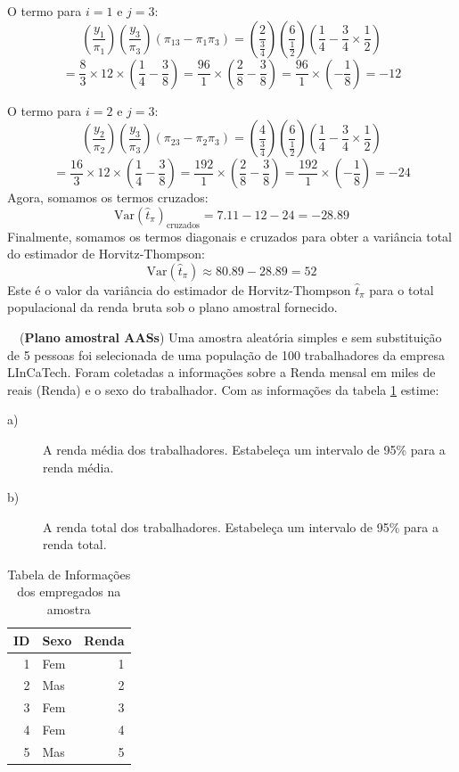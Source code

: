 \documentclass[a4paper,11pt,oneside,twocolumn]{Config/milktest}
\begin{document}
{O termo para \(i = 1\) e \(j = 3\): 
\[
\left(\frac{y_1}{\pi_1}\right) \left(\frac{y_3}{\pi_3}\right) (\pi_{13} - \pi_1 \pi_3) = \left(\frac{2}{\frac{3}{4}}\right) \left(\frac{6}{\frac{1}{2}}\right) \left(\frac{1}{4} - \frac{3}{4} \times \frac{1}{2}\right)
\] 
\[
= \frac{8}{3} \times 12 \times \left(\frac{1}{4} - \frac{3}{8}\right) = \frac{96}{1} \times \left(\frac{2}{8} - \frac{3}{8}\right) = \frac{96}{1} \times \left(-\frac{1}{8}\right) = -12
\]

O termo para \(i = 2\) e \(j = 3\): 
\[
\left(\frac{y_2}{\pi_2}\right) \left(\frac{y_3}{\pi_3}\right) (\pi_{23} - \pi_2 \pi_3) = \left(\frac{4}{\frac{3}{4}}\right) \left(\frac{6}{\frac{1}{2}}\right) \left(\frac{1}{4} - \frac{3}{4} \times \frac{1}{2}\right)
\] 
\[
= \frac{16}{3} \times 12 \times \left(\frac{1}{4} - \frac{3}{8}\right) = \frac{192}{1} \times \left(\frac{2}{8} - \frac{3}{8}\right) = \frac{192}{1} \times \left(-\frac{1}{8}\right) = -24
\] 
Agora, somamos os termos cruzados: 
\[
\text{Var}(\hat{t}_\pi)_{\text{cruzados}} = 7.11 - 12 - 24 = -28.89
\] 
Finalmente, somamos os termos diagonais e cruzados para obter a variância total do estimador de Horvitz-Thompson:
\[
\text{Var}(\hat{t}_\pi) \approx 80.89 - 28.89 = 52
\] 
Este é o valor da variância do estimador de Horvitz-Thompson \(\hat{t}_\pi\) para o total populacional da renda bruta sob o plano amostral fornecido.

}

\medskip 
\question~~({\bf Plano amostral AASs}) Uma amostra aleatória simples e sem substituição de 5 pessoas foi selecionada de uma população de 100 trabalhadores da empresa LInCaTech. Foram coletadas a informações sobre a Renda mensal em miles de reais (Renda) e o sexo do trabalhador. Com as informações da tabela \ref{ID:Renda} estime:

\begin{description}
    \item[a)] A renda média dos trabalhadores. Estabeleça um intervalo de 95\% para a renda média.
\item[b)] A renda total dos trabalhadores. Estabeleça um intervalo de 95\% para a renda total. 
\end{description}
{\small \begin{table}[H]
\centering
\begin{tabular}{rlr}
  \hline
ID & Sexo & Renda  \\ 
  \hline
    1 & Fem &  1 \\
    2 & Mas &  2\\
    3 & Fem &  3\\
    4 & Fem &  4\\
    5 & Mas &  5\\
   \hline
\end{tabular}
\caption{Tabela de Informações dos empregados na amostra} 
\label{ID:Renda}
\end{table}
}
\end{document}
